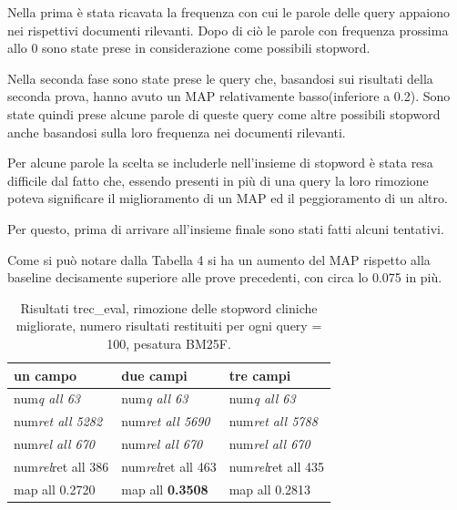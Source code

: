 \documentclass[runningheads]{llncs}
\begin{document}
Nella prima \`e stata ricavata la frequenza con cui le parole delle query appaiono nei rispettivi documenti rilevanti. Dopo di ci\`o le parole con frequenza prossima allo 0 sono state prese in considerazione come possibili stopword.

Nella seconda fase sono state prese le query che, basandosi sui risultati della seconda prova, hanno avuto un MAP relativamente basso(inferiore a 0.2). Sono state quindi prese alcune parole di queste query come altre possibili stopword anche basandosi sulla loro frequenza nei documenti rilevanti.

Per alcune parole la scelta se includerle nell'insieme di stopword \`e stata resa difficile dal fatto che, essendo presenti in pi\`u di una query la loro rimozione poteva significare il miglioramento di un MAP ed il peggioramento di un altro.

Per questo, prima di arrivare all'insieme finale sono stati fatti alcuni tentativi.




Come si pu\`o notare dalla Tabella 4 si ha un aumento del MAP rispetto alla baseline decisamente superiore alle prove precedenti, con circa lo 0.075 in pi\`u.
\begin{table}
\centering
\begin{tabular}{lll}
\hline
\textbf{ un campo }           & \textbf{ due campi }           & \textbf{ tre campi }            \\ \hline
 num\textit{q all 63 }       &  num\textit{q all 63 }       &  num\textit{q all 63 }        \\
 num\textit{ret all 5282 }  &  num\textit{ret all 5690 }  &  num\textit{ret all 5788 }   \\
 num\textit{rel all 670 }    &  num\textit{rel all 670 }    &  num\textit{rel all 670 }     \\
 num\textit{rel}ret all 386  &  num\textit{rel}ret all 463  &  num\textit{rel}ret all 435   \\
map all 0.2720               & map all \bf 0.3508               & map all 0.2813          \\ \hline
\end{tabular}

\caption{ Risultati trec\_eval, rimozione delle stopword cliniche migliorate, numero risultati restituiti per ogni query = 100, pesatura BM25F.}
\end{table}
\end{document}
